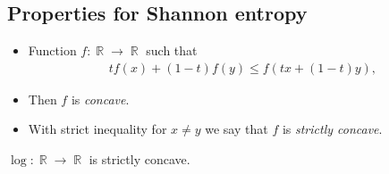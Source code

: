 \documentclass{beamer}
\DeclareMathOperator{\R}{\mathbb{R}}
\begin{document}
\subsection{Properties for Shannon entropy}

\begin{frame}
  \begin{definition}
    \begin{itemize}
      \item Function \(f\colon \R\to \R\) such that
        \begin{align*}
          tf(x) + (1-t)f(y) \leq f(tx + (1-t)y),
        \end{align*}

      \item Then \(f\) is \emph{concave}.
      \item With strict inequality for \(x\neq y\) we say that \(f\) is 
        \emph{strictly concave}.
    \end{itemize}
  \end{definition}

  \begin{example}
    \(\log\colon \R\to \R\) is strictly concave.
  \end{example}
\end{frame}

%
%
\end{document}
